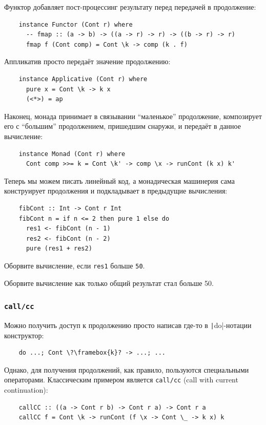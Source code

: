 Функтор добавляет пост-процессинг результату перед передачей в продолжение:
\begin{verbatim}
    instance Functor (Cont r) where
      -- fmap :: (a -> b) -> ((a -> r) -> r) -> ((b -> r) -> r)
      fmap f (Cont comp) = Cont \k -> comp (k . f)
\end{verbatim}

Аппликатив просто передаёт значение продолжению:
\begin{verbatim}
    instance Applicative (Cont r) where
      pure x = Cont \k -> k x
      (<*>) = ap
\end{verbatim}

Наконец, монада принимает в связывании ``маленькое'' продолжение, композирует его с ``большим'' продолжением, пришедшим снаружи, и передаёт в данное вычисление:
\begin{verbatim}
    instance Monad (Cont r) where
      Cont comp >>= k = Cont \k' -> comp \x -> runCont (k x) k'
\end{verbatim}

Теперь мы можем писать линейный код, а монадическая машинерия сама конструирует продолжения и подкладывает в предыдущие вычисления:
\begin{verbatim}
    fibCont :: Int -> Cont r Int
    fibCont n = if n <= 2 then pure 1 else do
      res1 <- fibCont (n - 1)
      res2 <- fibCont (n - 2)
      pure (res1 + res2)
\end{verbatim}

\begin{task}
    Оборвите вычисление, если \texttt{res1} больше \texttt{50}.
\end{task}

\begin{task}
    Оборвите вычисление как только общий результат стал больше 50.
\end{task}

\subsubsection{\texttt{call/cc}}

Можно получить доступ к продолжению просто написав где-то в \texttt|do|-нотации конструктор:
\begin{verbatim}
    do ...; Cont \?\framebox{k}? -> ...; ...
\end{verbatim}
Однако, для получения продолжений, как правило, пользуются специальными операторами.
Классическим примером является \texttt{call/cc} (call with current continuation):
\begin{verbatim}
    callCC :: ((a -> Cont r b) -> Cont r a) -> Cont r a
    callCC f = Cont \k -> runCont (f \x -> Cont \_ -> k x) k
\end{verbatim}

